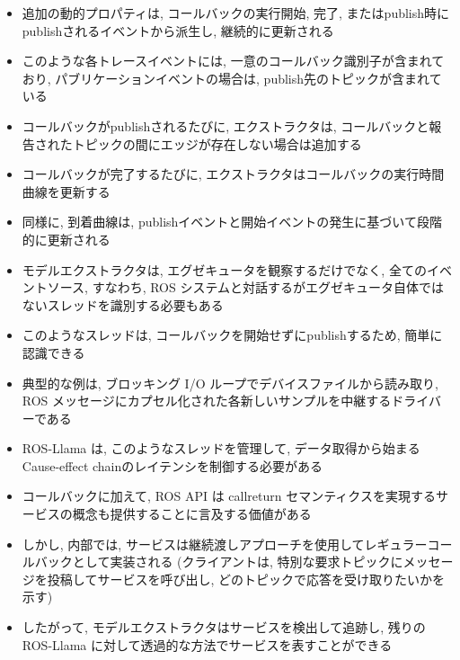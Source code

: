 \begin{frame}{}
    \begin{itemize}
        \item 追加の動的プロパティは, コールバックの実行開始, 完了, またはpublish時にpublishされるイベントから派生し, 継続的に更新される
\item このような各トレースイベントには, 一意のコールバック識別子が含まれており, パブリケーションイベントの場合は, publish先のトピックが含まれている
\item コールバックがpublishされるたびに, エクストラクタは, コールバックと報告されたトピックの間にエッジが存在しない場合は追加する
\item コールバックが完了するたびに, エクストラクタはコールバックの実行時間曲線を更新する
\item 同様に, 到着曲線は, publishイベントと開始イベントの発生に基づいて段階的に更新される
    \end{itemize}
\end{frame}

\begin{frame}{}
    \begin{itemize}
        \item モデルエクストラクタは, エグゼキュータを観察するだけでなく, 全てのイベントソース, すなわち, ROS システムと対話するがエグゼキュータ自体ではないスレッドを識別する必要もある
\item このようなスレッドは, コールバックを開始せずにpublishするため, 簡単に認識できる
\item 典型的な例は, ブロッキング I/O ループでデバイスファイルから読み取り, ROS メッセージにカプセル化された各新しいサンプルを中継するドライバーである
\item ROS-Llama は, このようなスレッドを管理して, データ取得から始まるCause-effect chainのレイテンシを制御する必要がある
    \end{itemize}
\end{frame}

\begin{frame}{}
    \begin{itemize}
        \item コールバックに加えて, ROS API は callreturn セマンティクスを実現するサービスの概念も提供することに言及する価値がある
\item しかし, 内部では, サービスは継続渡しアプローチを使用してレギュラーコールバックとして実装される (クライアントは, 特別な要求トピックにメッセージを投稿してサービスを呼び出し, どのトピックで応答を受け取りたいかを示す)
\item したがって, モデルエクストラクタはサービスを検出して追跡し, 残りの ROS-Llama に対して透過的な方法でサービスを表すことができる
    \end{itemize}
\end{frame}

